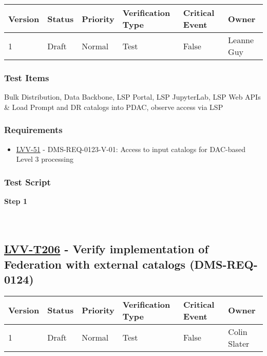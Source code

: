 \begin{longtable}[]{@{}llllll@{}}
\toprule
Version & Status & Priority & Verification Type & Critical Event &
Owner\tabularnewline
\midrule
\endhead
1 & Draft & Normal & Test & False & Leanne Guy\tabularnewline
\bottomrule
\end{longtable}

\hypertarget{test-items-181}{%
\subsubsection{Test Items}\label{test-items-181}}

Bulk Distribution, Data Backbone, LSP Portal, LSP JupyterLab, LSP Web
APIs \& Load Prompt and DR catalogs into PDAC, observe access via LSP

\hypertarget{requirements-182}{%
\subsubsection{Requirements}\label{requirements-182}}

\begin{itemize}
\tightlist
\item
  \href{https://jira.lsstcorp.org/browse/LVV-51}{LVV-51} -
  DMS-REQ-0123-V-01: Access to input catalogs for DAC-based Level 3
  processing
\end{itemize}

\hypertarget{test-script-182}{%
\subsubsection{Test Script}\label{test-script-182}}

\textbf{Step 1}\\
~\\
~\\

\hypertarget{lvv-t206---verify-implementation-of-federation-with-external-catalogs-dms-req-0124}{%
\subsection{\texorpdfstring{\href{https://jira.lsstcorp.org/secure/Tests.jspa\#/testCase/LVV-T206}{LVV-T206}
- Verify implementation of Federation with external catalogs
(DMS-REQ-0124)}{LVV-T206 - Verify implementation of Federation with external catalogs (DMS-REQ-0124)}}\label{lvv-t206---verify-implementation-of-federation-with-external-catalogs-dms-req-0124}}

\begin{longtable}[]{@{}llllll@{}}
\toprule
Version & Status & Priority & Verification Type & Critical Event &
Owner\tabularnewline
\midrule
\endhead
1 & Draft & Normal & Test & False & Colin Slater\tabularnewline
\bottomrule
\end{longtable}

